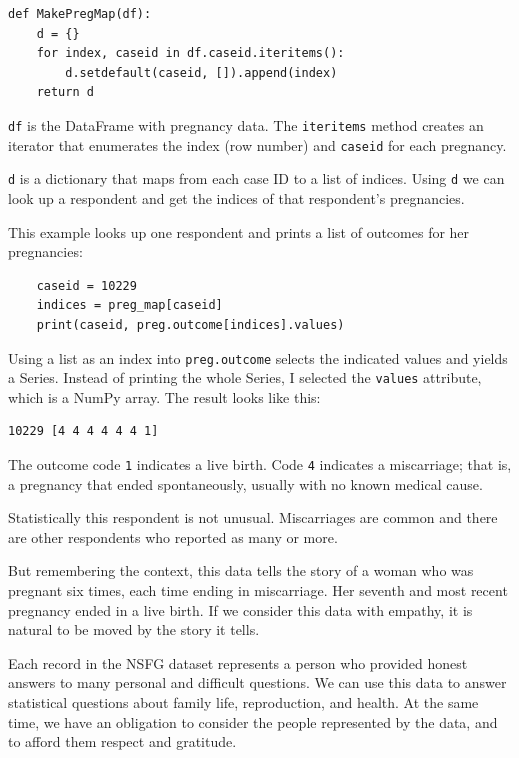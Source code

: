 \documentclass[12pt]{book}
\begin{document}
\begin{verbatim}
def MakePregMap(df):
    d = {}
    for index, caseid in df.caseid.iteritems():
        d.setdefault(caseid, []).append(index)
    return d
\end{verbatim}

{\tt df} is the DataFrame with pregnancy data.  The {\tt iteritems}
method creates an iterator that enumerates the index (row number)
and {\tt caseid} for each pregnancy.

{\tt d} is a dictionary that maps from each case ID to a list of
indices.  Using {\tt d} we can look up a respondent and 
get the indices of
that respondent's pregnancies.

This example looks up one respondent and prints a list of outcomes
for her pregnancies:

\begin{verbatim}
    caseid = 10229
    indices = preg_map[caseid]
    print(caseid, preg.outcome[indices].values)
\end{verbatim}

Using a list as an index into {\tt preg.outcome} selects the
indicated values and yields a Series.  Instead of printing the
whole Series, I selected the {\tt values} attribute, which is
a NumPy array.  The result looks like this:

\begin{verbatim}
10229 [4 4 4 4 4 4 1]
\end{verbatim}

The outcome code {\tt 1} indicates a live birth. Code {\tt 4} indicates
a miscarriage; that is, a pregnancy that ended spontaneously, usually
with no known medical cause.

Statistically this respondent is not unusual.  Miscarriages are common
and there are other respondents who reported as many or more.

But remembering the context, this data tells the story of a woman who
was pregnant six times, each time ending in miscarriage.  Her seventh
and most recent pregnancy ended in a live birth.  If we consider this
data with empathy, it is natural to be moved by the story it tells.

Each record in the NSFG dataset represents a person who provided
honest answers to many personal and difficult questions.  We can use
this data to answer statistical questions about family life,
reproduction, and health.  At the same time, we have an obligation
to consider the people represented by the data, and to afford them
respect and gratitude.
\end{document}
